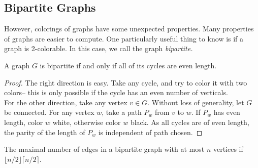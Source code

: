 \subsection{Bipartite Graphs}
 However, colorings of graphs have some unexpected properties. Many properties of graphs are easier to compute. One particularly useful thing to know is if a graph is 2-colorable. In this case, we call the graph \emph{bipartite.}
\begin{claim}
 A graph $G$ is bipartite if and only if all of its cycles are even length. 
\end{claim}
\begin{proof}
 The right direction is easy. Take any cycle, and try to color it with two colors-- this is only possible if the cycle has an even number of verticals. \\
 For the other direction, take any vertex $v\in G$. Without loss of generality, let $G$ be connected. For any vertex $w$, take a path $P_w$ from $v$ to $w$. If $P_w$ has even length, color $w$ white, otherwise color $w$ black. As all cycles are of even length, the parity of the length of $P_w$ is independent of path chosen. 
\end{proof}

\begin{claim}
 The maximal number of edges in a bipartite graph with at most $n$ vertices if $\lfloor n/2 \rfloor \lceil n/2 \rceil$. 
\end{claim}

